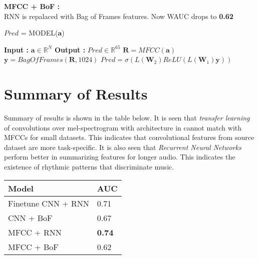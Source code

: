 \noindent \textbf{MFCC + BoF :}\\
RNN is repalaced with Bag of Frames features. Now WAUC drops to \textbf{0.62}
\begin{algorithm}
  \caption{$Pred$ = MODEL($\textbf{a}$) }\label{alg:mfccbow}
  \begin{algorithmic}[1]
    \Statex \textbf{Input :} $\textbf{a} \in \mathbb{R}^{N}$
    \Statex \textbf{Output :} $Pred \in \mathbb{R}^{65}$ 
    \State $\textbf{R} = MFCC(\textbf{a})$ 
   \State $\textbf{y} = BagOfFrames(\textbf{R},1024)$ 
     \State $Pred = \sigma(L(\textbf{W}_{2})ReLU(L(\textbf{W}_{1})\textbf{y}))$ 
  \end{algorithmic}
\end{algorithm}
\FloatBarrier    

\section{Summary of Results}
\label{results}
Summary of results is shown in the table below. It is seen that \textit{transfer learning} of convolutions over mel-spectrogram with architecture in \cite{choi_cnn}  cannot match with MFCCs for small datasets. This indicates that convolutional features from source dataset are more task-specific. It is also seen that \textit{Recurrent Neural Networks} perform better in summarizing features for longer audio. This indicates the existence of rhythmic patterns that discriminate music. 

   \begin{tabular}{ | p{5cm} | l |}
    \hline
    \textbf{Model} & \textbf{AUC} \\ \hline
    Finetune CNN + RNN &  0.71\\ \hline
    CNN + BoF  &  0.67\\ \hline
    MFCC + RNN &  \textbf{0.74} \\ \hline
    MFCC + BoF &  0.62 \\ \hline
    \hline
    \end{tabular}

